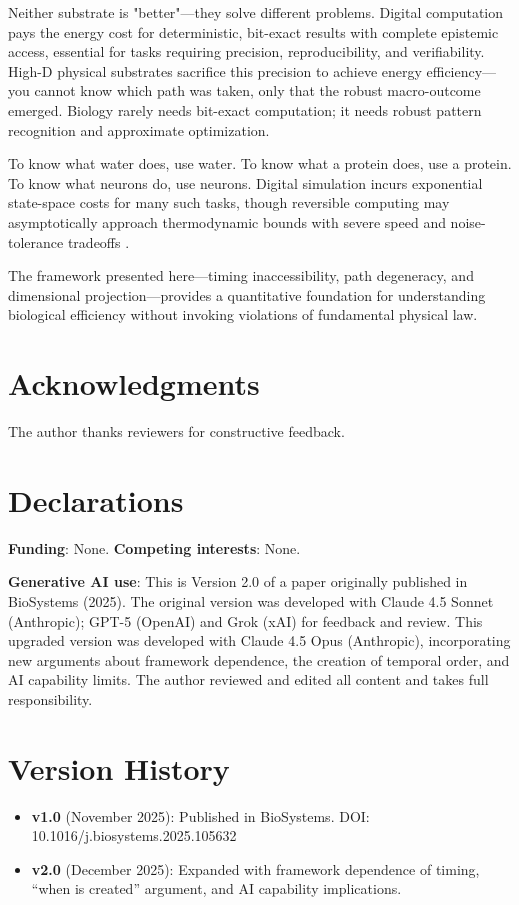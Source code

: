 \documentclass[12pt]{article}
\numberwithin{equation}{section}
\begin{document}
Neither substrate is "better"—they solve different problems. Digital computation pays the energy cost for deterministic, bit-exact results with complete epistemic access, essential for tasks requiring precision, reproducibility, and verifiability. High-D physical substrates sacrifice this precision to achieve energy efficiency—you cannot know which path was taken, only that the robust macro-outcome emerged. Biology rarely needs bit-exact computation; it needs robust pattern recognition and approximate optimization.

To know what water does, use water. To know what a protein does, use a protein. To know what neurons do, use neurons. Digital simulation incurs exponential state-space costs for many such tasks, though reversible computing may asymptotically approach thermodynamic bounds with severe speed and noise-tolerance tradeoffs \cite{bennett1982,frank2019}.

The framework presented here—timing inaccessibility, path degeneracy, and dimensional projection—provides a quantitative foundation for understanding biological efficiency without invoking violations of fundamental physical law.

\section*{Acknowledgments}
The author thanks reviewers for constructive feedback.

\section*{Declarations}
\textbf{Funding}: None. \textbf{Competing interests}: None.

\textbf{Generative AI use}: This is Version 2.0 of a paper originally published in BioSystems (2025). The original version was developed with Claude 4.5 Sonnet (Anthropic); GPT-5 (OpenAI) and Grok (xAI) for feedback and review. This upgraded version was developed with Claude 4.5 Opus (Anthropic), incorporating new arguments about framework dependence, the creation of temporal order, and AI capability limits. The author reviewed and edited all content and takes full responsibility.

\section*{Version History}
\begin{itemize}
\item \textbf{v1.0} (November 2025): Published in BioSystems. DOI: 10.1016/j.biosystems.2025.105632
\item \textbf{v2.0} (December 2025): Expanded with framework dependence of timing, ``when is created'' argument, and AI capability implications.
\end{itemize}
\end{document}
